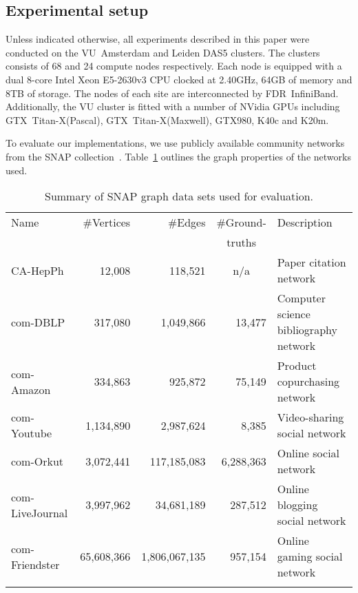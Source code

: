\subsection{Experimental setup}
\label{sec-experimental}

Unless indicated otherwise, all experiments described in this paper
were conducted on the VU~Amsterdam and Leiden DAS5 clusters.  The clusters
consists of 68 and 24 compute nodes respectively. Each node is equipped with
a dual 8-core Intel Xeon E5-2630v3 CPU clocked at 2.40GHz, 64GB of memory and
8TB of storage. The nodes of each site are interconnected by FDR~InfiniBand.
Additionally, the VU cluster is fitted with a number of NVidia GPUs including
GTX~\mbox{Titan-X(Pascal)},
GTX~\mbox{Titan-X(Maxwell)}, GTX980, K40c and K20m.

To evaluate our implementations, we use publicly available
community networks from the SNAP collection~\cite{snapnets}.
Table~\ref{table-snap}
outlines the graph properties of the networks used.

\begin{table}
  \centering
  \def\tabcolsep{0.2em}
  \begin{tabular}{l r r r p{9em}}
    Name            & \#Vertices &       \#Edges & \multicolumn{1}{c}{\#Ground-} & Description \\
                    &            &               & \multicolumn{1}{c}{truths}    &             \\
    \hline
    CA-HepPh        &    12,008  &    118,521    & \multicolumn{1}{c}{n/a}       & Paper citation network \\
    com-DBLP        &    317,080 &     1,049,866 & 13,477         & Computer science bibliography network \\
    com-Amazon      &    334,863 &       925,872 & 75,149         & Product copurchasing network \\
    com-Youtube     &  1,134,890 &     2,987,624 & 8,385          & Video-sharing social network \\
    com-Orkut       &  3,072,441 &   117,185,083 & 6,288,363      & Online social network \\
    com-LiveJournal &  3,997,962 &    34,681,189 & 287,512        & Online blogging social network \\
    com-Friendster  & 65,608,366 & 1,806,067,135 & 957,154        & Online gaming social network \\
    \hline
    \\[-1ex]
  \end{tabular}
  \caption{Summary of SNAP graph data sets used for evaluation.}
  \label{table-snap}
\end{table}

